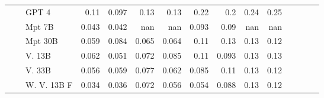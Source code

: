 \begin{table}[!htbp]
\begin{tabular}{l|l|l|rrrr|rrrr|rrrr}
&  & GPT 4     & {\cellcolor[HTML]{3787C0}} \color[HTML]{F1F1F1} 0.11 & {\cellcolor[HTML]{5AA2CF}} \color[HTML]{F1F1F1} 0.097 & {\cellcolor[HTML]{2171B5}} \color[HTML]{F1F1F1} 0.13 & {\cellcolor[HTML]{1865AC}} \color[HTML]{F1F1F1} 0.13  & {\cellcolor[HTML]{CB181D}} \color[HTML]{F1F1F1} 0.22 & {\cellcolor[HTML]{EC382B}} \color[HTML]{F1F1F1} 0.2 & {\cellcolor[HTML]{B31218}} \color[HTML]{F1F1F1} 0.24 & {\cellcolor[HTML]{AA1016}} \color[HTML]{F1F1F1} 0.25 \\
&  & Mpt 7B    & {\cellcolor[HTML]{D1E2F3}} \color[HTML]{000000} 0.043 & {\cellcolor[HTML]{D3E3F3}} \color[HTML]{000000} 0.042 & {\cellcolor[HTML]{000000}} \color[HTML]{F1F1F1} nan & {\cellcolor[HTML]{000000}} \color[HTML]{F1F1F1} nan  & {\cellcolor[HTML]{FCBDA4}} \color[HTML]{000000} 0.093 & {\cellcolor[HTML]{FCC2AA}} \color[HTML]{000000} 0.09 & {\cellcolor[HTML]{000000}} \color[HTML]{F1F1F1} nan & {\cellcolor[HTML]{000000}} \color[HTML]{F1F1F1} nan \\
&  & Mpt 30B   & {\cellcolor[HTML]{B5D4E9}} \color[HTML]{000000} 0.059 & {\cellcolor[HTML]{79B5D9}} \color[HTML]{000000} 0.084 & {\cellcolor[HTML]{AACFE5}} \color[HTML]{000000} 0.065 & {\cellcolor[HTML]{ADD0E6}} \color[HTML]{000000} 0.064  & {\cellcolor[HTML]{FCAA8D}} \color[HTML]{000000} 0.11 & {\cellcolor[HTML]{FC9474}} \color[HTML]{000000} 0.13 & {\cellcolor[HTML]{FC9373}} \color[HTML]{000000} 0.13 & {\cellcolor[HTML]{FCA183}} \color[HTML]{000000} 0.12 \\
&  & V. 13B    & {\cellcolor[HTML]{AFD1E7}} \color[HTML]{000000} 0.062 & {\cellcolor[HTML]{C7DCEF}} \color[HTML]{000000} 0.051 & {\cellcolor[HTML]{9AC8E0}} \color[HTML]{000000} 0.072 & {\cellcolor[HTML]{75B4D8}} \color[HTML]{000000} 0.085  & {\cellcolor[HTML]{FCA486}} \color[HTML]{000000} 0.11 & {\cellcolor[HTML]{FCBEA5}} \color[HTML]{000000} 0.093 & {\cellcolor[HTML]{FC9272}} \color[HTML]{000000} 0.13 & {\cellcolor[HTML]{FC8F6F}} \color[HTML]{000000} 0.13 \\
&  & V. 33B  & {\cellcolor[HTML]{BED8EC}} \color[HTML]{000000} 0.056 & {\cellcolor[HTML]{B5D4E9}} \color[HTML]{000000} 0.059 & {\cellcolor[HTML]{8ABFDD}} \color[HTML]{000000} 0.077 & {\cellcolor[HTML]{B0D2E7}} \color[HTML]{000000} 0.062  & {\cellcolor[HTML]{FDC7B2}} \color[HTML]{000000} 0.085 & {\cellcolor[HTML]{FCAA8D}} \color[HTML]{000000} 0.11 & {\cellcolor[HTML]{FC8D6D}} \color[HTML]{F1F1F1} 0.13 & {\cellcolor[HTML]{FC9C7D}} \color[HTML]{000000} 0.12 \\
&  & W. V. 13B  F & {\cellcolor[HTML]{DEEBF7}} \color[HTML]{000000} 0.034 & {\cellcolor[HTML]{DAE8F6}} \color[HTML]{000000} 0.036 & {\cellcolor[HTML]{9AC8E0}} \color[HTML]{000000} 0.072 & {\cellcolor[HTML]{BED8EC}} \color[HTML]{000000} 0.056  & {\cellcolor[HTML]{FEE6DA}} \color[HTML]{000000} 0.054 & {\cellcolor[HTML]{FCC4AD}} \color[HTML]{000000} 0.088 & {\cellcolor[HTML]{FC9272}} \color[HTML]{000000} 0.13 & {\cellcolor[HTML]{FC9D7F}} \color[HTML]{000000} 0.12 \\

\end{tabular}
\end{table}
